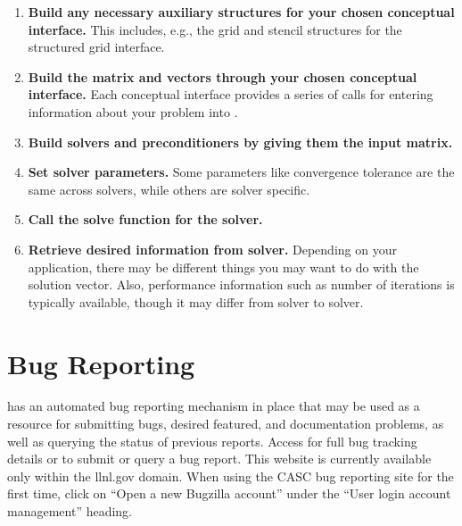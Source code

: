 \begin{enumerate}

\item
{\bf Build any necessary auxiliary structures for your chosen conceptual
interface.} This includes, e.g., 
the grid and stencil structures for the structured grid interface.

\item
{\bf Build the matrix and vectors through your chosen conceptual interface.} Each
conceptual interface 
provides a series of calls for entering information about your problem into
\hypre{}.

\item
{\bf Build solvers and preconditioners by giving them the input matrix.}

\item
{\bf Set solver parameters.} Some parameters like convergence tolerance are the
same across solvers, 
while others are solver specific.

\item
{\bf Call the solve function for the solver.}

\item
{\bf Retrieve desired information from solver.} Depending on your application,
there may be different 
things you may want to do with the solution vector. Also, performance
information such as number of 
iterations is typically available, though it may differ from solver to solver.

\end{enumerate}



\section{Bug Reporting}

\hypre{} has an automated bug reporting mechanism in place that may be used 
as a resource for submitting bugs, desired featured, and documentation
problems, as well as querying the status of previous reports.  Access
for full bug tracking details or to submit or query a bug report.
This website is currently available only within the llnl.gov domain.
When using the CASC bug reporting site for the first time, click on
``Open a new Bugzilla account'' under the ``User login account
management'' heading.
